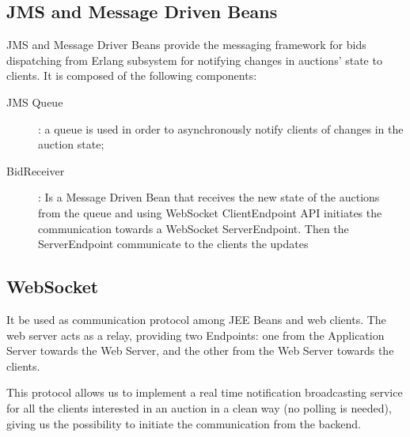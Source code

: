 \subsection{JMS and Message Driven Beans}

JMS and Message Driver Beans provide the messaging framework for bids
dispatching from Erlang subsystem for notifying changes in auctions’ state to
clients. It is composed of the following components:

\begin{description}
    \item [JMS Queue]: a queue is used in order to asynchronously notify clients
	    of changes in the auction state;
    \item [BidReceiver]: Is a Message Driven Bean that receives the new state of
	    the auctions from the queue and using WebSocket ClientEndpoint API
	    initiates the communication towards a WebSocket ServerEndpoint. Then
	    the ServerEndpoint communicate to the clients the updates
\end{description}


\subsection{WebSocket}

It be used as communication protocol among JEE Beans and web clients. The web
server acts as a relay, providing two Endpoints: one from the Application Server
towards the Web Server, and the other from the Web Server towards the clients. 

This protocol allows us to implement a real time notification broadcasting
service for all the clients interested in an auction in a clean way (no polling
is needed), giving us the possibility to initiate the communication from the
backend.
